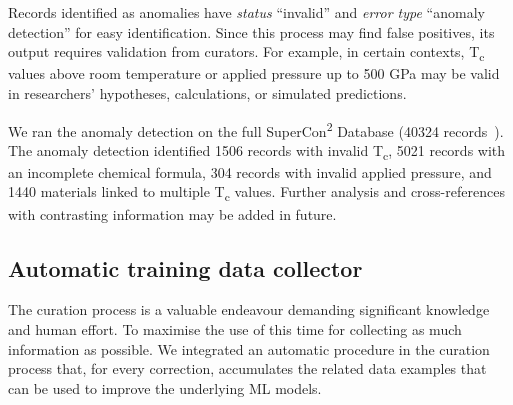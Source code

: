 Records identified as anomalies have \emph{status} ``invalid'' and \emph{error type} ``anomaly detection'' for easy identification.
Since this process may find false positives, its output requires validation from curators. 
For example, in certain contexts, T\textsubscript{c} values above room temperature or applied pressure up to 500 GPa may be valid in researchers' hypotheses, calculations, or simulated predictions. 

We ran the anomaly detection on the full SuperCon\textsuperscript{2} Database (40324 records~\cite{foppiano2023automatic}). 
The anomaly detection identified 1506 records with invalid T\textsubscript{c}, 5021 records with an incomplete chemical formula, 304 records with invalid applied pressure, and 1440 materials linked to multiple T\textsubscript{c} values. 
Further analysis and cross-references with contrasting information may be added in future. 

\subsection{Automatic training data collector}
\label{subsec:feedback-loop-training-data}
The curation process is a valuable endeavour demanding significant knowledge and human effort. 
To maximise the use of this time for collecting as much information as possible.
We integrated an automatic procedure in the curation process that, for every correction, accumulates the related data examples that can be used to improve the underlying ML models. 

